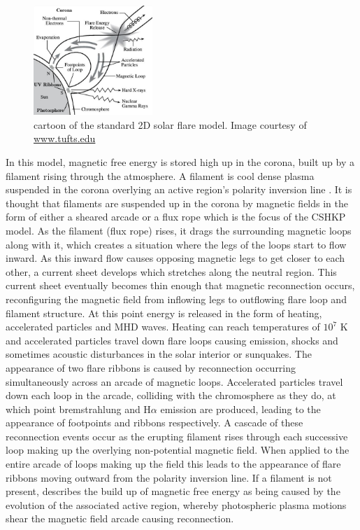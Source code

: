 \begin{figure}[H]
  \begin{center}
  \includegraphics[width=0.40\textwidth]{flare}
  \caption{cartoon of the standard 2D solar flare model. Image courtesy of \href{http://ase.tufts.edu/cosmos/print_images.asp?id=47}{www.tufts.edu}}\label{flare-cartoon}
\end{center}
\end{figure}

In this model, magnetic free energy is stored high up in the corona, built up by a filament rising through the atmosphere. A filament is cool dense plasma suspended in the corona overlying an active region's polarity inversion line \citep{1955ApJ...121..349B}. It is thought that filaments are suspended up in the corona by magnetic fields in the form of either a sheared arcade or a flux rope which is the focus of the CSHKP model. As the filament (flux rope) rises, it drags the surrounding magnetic loops along with it, which creates a situation where the legs of the loops start to flow inward. As this inward flow causes opposing magnetic legs to get closer to each other, a current sheet develops which stretches along the neutral region. This current sheet eventually becomes thin enough that magnetic reconnection occurs, reconfiguring the magnetic field from inflowing legs to outflowing flare loop and filament structure. At this point energy is released in the form of heating, accelerated particles and MHD waves. Heating can reach temperatures of $10^7$ K and accelerated particles travel down flare loops causing emission, shocks and sometimes acoustic disturbances in the solar interior or sunquakes. The appearance of two flare ribbons is caused by reconnection occurring simultaneously across an arcade of magnetic loops. Accelerated particles travel down each loop in the arcade, colliding with the chromosphere as they do, at which point bremstrahlung and H$\alpha$ emission are produced, leading to the appearance of footpoints and ribbons respectively. A cascade of these reconnection events occur as the erupting filament rises through each successive loop making up the overlying non-potential magnetic field. When applied to the entire arcade of loops making up the field this leads to the appearance of flare ribbons moving outward from the polarity inversion line. If a filament is not present, \cite{2005psci.book.....A} describes the build up of magnetic free energy as being caused by the evolution of the associated active region, whereby photospheric plasma motions shear the magnetic field arcade causing reconnection. 



